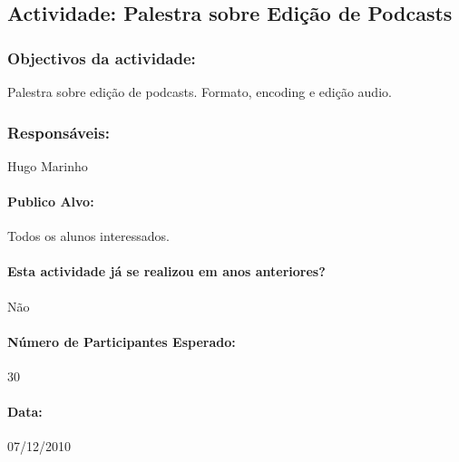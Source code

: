 \subsection{Actividade: Palestra sobre Edição de Podcasts} %

\subsubsection*{Objectivos da actividade:}
Palestra sobre edição de podcasts. Formato, encoding e edição audio.

\subsubsection*{Responsáveis:}
\begin{itemizedash}
	\item{Hugo Marinho}
\end{itemizedash}

\paragraph{Publico Alvo: }
Todos os alunos interessados.

\paragraph{Esta actividade já se realizou em anos anteriores?}
Não

\paragraph{Número de Participantes Esperado:}
30

\paragraph{Data:} 07/12/2010

\vspace{20pt}
